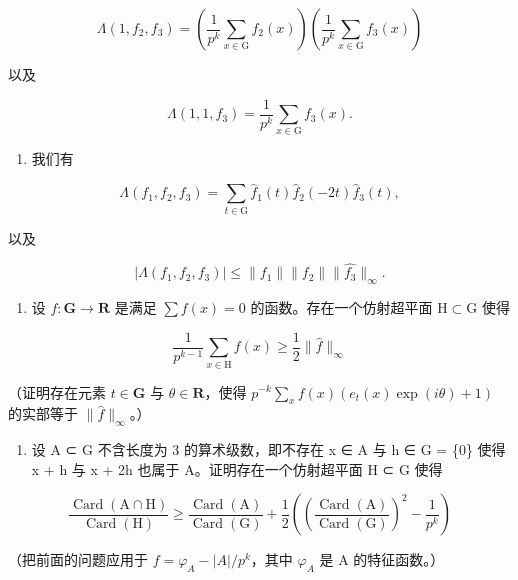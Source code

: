 \[
\Lambda (1, f _ {2}, f _ {3}) = \left(\frac {1}{p ^ {k}} \sum_ {x \in \mathrm{G}} f _ {2} (x)\right) \left(\frac {1}{p ^ {k}} \sum_ {x \in \mathrm{G}} f _ {3} (x)\right)
\]

以及

\[
\Lambda (1, 1, f _ {3}) = \frac {1}{p ^ {k}} \sum_ {x \in \mathrm{G}} f _ {3} (x).
\]

\begin{enumerate}
\def\labelenumi{\alph{enumi})}
\setcounter{enumi}{1}
\tightlist
\item
我们有
\end{enumerate}

\[
\Lambda (f _ {1}, f _ {2}, f _ {3}) = \sum_ {t \in \mathrm{G}} \widehat {f} _ {1} (t) \widehat {f} _ {2} (- 2 t) \widehat {f} _ {3} (t),
\]

以及

\[
| \Lambda (f _ {1}, f _ {2}, f _ {3}) | \leqslant \| f _ {1} \| \| f _ {2} \| \| \widehat {f _ {3}} \| _ {\infty}.
\]

\begin{enumerate}
\def\labelenumi{\alph{enumi})}
\setcounter{enumi}{2}
\tightlist
\item
  设 \(f \colon \mathbf{G} \to \mathbf{R}\) 是满足 \(\sum f(x) = 0\) 的函数。存在一个仿射超平面 \(\mathrm{H} \subset \mathrm{G}\) 使得
\end{enumerate}

\[
\frac {1}{p ^ {k - 1}} \sum_ {x \in \mathrm{H}} f (x) \geqslant \frac {1}{2} \| \widehat {f} \| _ {\infty}
\]

（证明存在元素 \(t \in \mathbf{G}\) 与 \(\theta \in \mathbf{R}\)，使得 \(p^{-k} \sum_{x} f(x)(e_t(x) \exp(i\theta) + 1)\) 的实部等于 \(\| \widehat{f} \|_{\infty}\)。）

\begin{enumerate}
\def\labelenumi{\alph{enumi})}
\setcounter{enumi}{3}
\tightlist
\item
  设 A ⊂ G 不含长度为 3 的算术级数，即不存在 x ∈ A 与 h ∈ G = \{0\} 使得 x + h 与 x + 2h 也属于 A。证明存在一个仿射超平面 H ⊂ G 使得
\end{enumerate}

\[
\frac {\operatorname{Card} (\mathrm{A} \cap \mathrm{H})}{\operatorname{Card} (\mathrm{H})} \geqslant \frac {\operatorname{Card} (\mathrm{A})}{\operatorname{Card} (\mathrm{G})} + \frac {1}{2} \left(\left(\frac {\operatorname{Card} (\mathrm{A})}{\operatorname{Card} (\mathrm{G})}\right) ^ {2} - \frac {1}{p ^ {k}}\right)
\]

（把前面的问题应用于 \(f = \varphi_{A} - |A|/p^{k}\)，其中 \(\varphi_{A}\) 是 A 的特征函数。）

